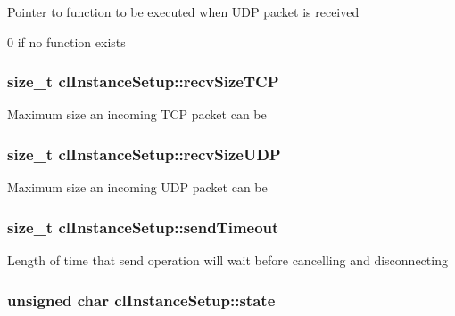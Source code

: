 \label{classcl_instance_setup_aef8ff6fa818c71994b82807842c583c6}
Pointer to function to be executed when UDP packet is received \par
 0 if no function exists \hypertarget{classcl_instance_setup_a89cd87a06080b11b12b79039a6e94c7b}{
\subsubsection[{recvSizeTCP}]{\setlength{\rightskip}{0pt plus 5cm}size\_\-t {\bf clInstanceSetup::recvSizeTCP}}}
\label{classcl_instance_setup_a89cd87a06080b11b12b79039a6e94c7b}
Maximum size an incoming TCP packet can be \hypertarget{classcl_instance_setup_af5e4d3fb91a77f2e31ca2171de9750b5}{
\subsubsection[{recvSizeUDP}]{\setlength{\rightskip}{0pt plus 5cm}size\_\-t {\bf clInstanceSetup::recvSizeUDP}}}
\label{classcl_instance_setup_af5e4d3fb91a77f2e31ca2171de9750b5}
Maximum size an incoming UDP packet can be \hypertarget{classcl_instance_setup_aba8346dc52f0073ef110675593b71af6}{
\subsubsection[{sendTimeout}]{\setlength{\rightskip}{0pt plus 5cm}size\_\-t {\bf clInstanceSetup::sendTimeout}}}
\label{classcl_instance_setup_aba8346dc52f0073ef110675593b71af6}
Length of time that send operation will wait before cancelling and disconnecting \hypertarget{classcl_instance_setup_a16da9e8e5cd44f8062f02101222102fc}{
\subsubsection[{state}]{\setlength{\rightskip}{0pt plus 5cm}unsigned char {\bf clInstanceSetup::state}}}
